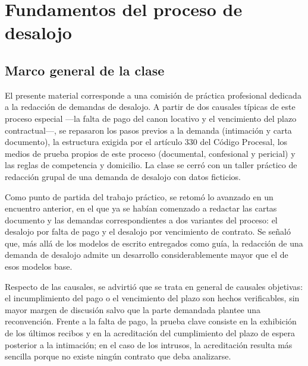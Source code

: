 \documentclass[12pt,oneside]{book}
\begin{document}
\tableofcontents


\chapter{Fundamentos del proceso de desalojo}

\section{Marco general de la clase}

El presente material corresponde a una comisión de práctica profesional dedicada a la redacción de demandas de desalojo. A partir de dos causales típicas de este proceso especial ---la falta de pago del canon locativo y el vencimiento del plazo contractual---, se repasaron los pasos previos a la demanda (intimación y carta documento), la estructura exigida por el artículo 330 del Código Procesal, los medios de prueba propios de este proceso (documental, confesional y pericial) y las reglas de competencia y domicilio. La clase se cerró con un taller práctico de redacción grupal de una demanda de desalojo con datos ficticios.

Como punto de partida del trabajo práctico, se retomó lo avanzado en un encuentro anterior, en el que ya se habían comenzado a redactar las cartas documento y las demandas correspondientes a dos variantes del proceso: el desalojo por falta de pago y el desalojo por vencimiento de contrato. Se señaló que, más allá de los modelos de escrito entregados como guía, la redacción de una demanda de desalojo admite un desarrollo considerablemente mayor que el de esos modelos base.

Respecto de las causales, se advirtió que se trata en general de causales objetivas: el incumplimiento del pago o el vencimiento del plazo son hechos verificables, sin mayor margen de discusión salvo que la parte demandada plantee una reconvención. Frente a la falta de pago, la prueba clave consiste en la exhibición de los últimos recibos y en la acreditación del cumplimiento del plazo de espera posterior a la intimación; en el caso de los intrusos, la acreditación resulta más sencilla porque no existe ningún contrato que deba analizarse.
\end{document}
